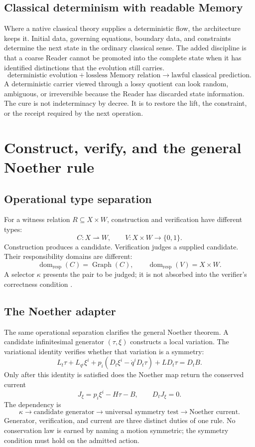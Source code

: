 \documentclass[11pt]{article}
\begin{document}
\subsection{Classical determinism with readable Memory}

Where a native classical theory supplies a deterministic flow, the architecture keeps it. Initial data, governing equations, boundary data, and constraints determine the next state in the ordinary classical sense. The added discipline is that a coarse Reader cannot be promoted into the complete state when it has identified distinctions that the evolution still carries.
\[
\boxed{
\text{deterministic evolution}
+\text{lossless Memory relation}
\longrightarrow
\text{lawful classical prediction}.
}
\]
A deterministic carrier viewed through a lossy quotient can look random, ambiguous, or irreversible because the Reader has discarded state information. The cure is not indeterminacy by decree. It is to restore the lift, the constraint, or the receipt required by the next operation.

\section{Construct, verify, and the general Noether rule}

\subsection{Operational type separation}

For a witness relation $R\subseteq X\times W$, construction and verification have different types:
\[
C:X\rightharpoonup W,
\qquad
V:X\times W\to\{0,1\}.
\]
Construction produces a candidate. Verification judges a supplied candidate. Their responsibility domains are different:
\[
\operatorname{dom}_{\mathrm{resp}}(C)=\operatorname{Graph}(C),
\qquad
\operatorname{dom}_{\mathrm{resp}}(V)=X\times W.
\]
A selector $\kappa$ presents the pair to be judged; it is not absorbed into the verifier's correctness condition \cite{CoppaVerifyConstruct2026,CoppaVerifyAddendum2026}.

\subsection{The Noether adapter}

The same operational separation clarifies the general Noether theorem. A candidate infinitesimal generator $(\tau,\xi)$ constructs a local variation. The variational identity verifies whether that variation is a symmetry:
\[
L_t\tau+L_{q^i}\xi^i+p_i(D_t\xi^i-\dot q^iD_t\tau)+L D_t\tau=D_tB.
\]
Only after this identity is satisfied does the Noether map return the conserved current
\[
\boxed{J_\xi=p_i\xi^i-H\tau-B,
\qquad
D_tJ_\xi=0.}
\]
The dependency is
\[
\boxed{
\kappa
\to
\text{candidate generator}
\to
\text{universal symmetry test}
\to
\text{Noether current}.
}
\]
Generator, verification, and current are three distinct duties of one rule. No conservation law is earned by naming a motion symmetric; the symmetry condition must hold on the admitted action.
\end{document}
